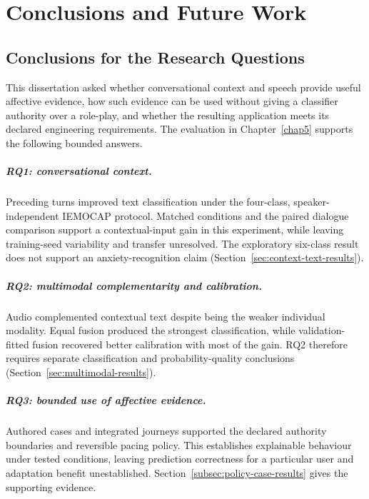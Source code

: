 \chapter{Conclusions and Future Work}
\label{chap6}

\section{Conclusions for the Research Questions}
\label{sec:conclusion-research-questions}

This dissertation asked whether conversational context and speech provide useful affective evidence, how such evidence can be used without giving a classifier authority over a role-play, and whether the resulting application meets its declared engineering requirements. The evaluation in Chapter~\ref{chap5} supports the following bounded answers.

\paragraph{RQ1: conversational context.}
\label{subsec:conclusion-rq1}
Preceding turns improved text classification under the four-class, speaker-independent IEMOCAP protocol. Matched conditions and the paired dialogue comparison support a contextual-input gain in this experiment, while leaving training-seed variability and transfer unresolved. The exploratory six-class result does not support an anxiety-recognition claim (Section~\ref{sec:context-text-results}).

\paragraph{RQ2: multimodal complementarity and calibration.}
\label{subsec:conclusion-rq2}
Audio complemented contextual text despite being the weaker individual modality. Equal fusion produced the strongest classification, while validation-fitted fusion recovered better calibration with most of the gain. RQ2 therefore requires separate classification and probability-quality conclusions (Section~\ref{sec:multimodal-results}).

\paragraph{RQ3: bounded use of affective evidence.}
\label{subsec:conclusion-rq3}
Authored cases and integrated journeys supported the declared authority boundaries and reversible pacing policy. This establishes explainable behaviour under tested conditions, leaving prediction correctness for a particular user and adaptation benefit unestablished. Section~\ref{subsec:policy-case-results} gives the supporting evidence.

